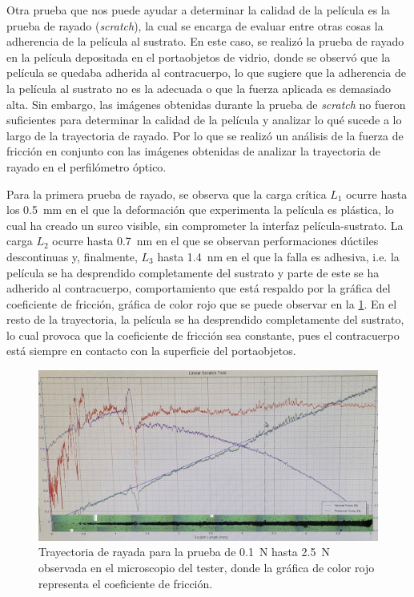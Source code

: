 \documentclass[12pt]{IEEEtran}
\begin{document}
Otra prueba que nos puede ayudar a determinar la calidad de la película es la prueba de rayado (\emph{scratch}), la cual se encarga de evaluar entre otras cosas la adherencia de la película al sustrato. En este caso, se realizó la prueba de rayado en la película depositada en el portaobjetos de vidrio, donde se observó que la película se quedaba adherida al contracuerpo, lo que sugiere que la adherencia de la película al sustrato no es la adecuada o que la fuerza aplicada es demasiado alta. Sin embargo, las imágenes obtenidas durante la prueba de \emph{scratch} no fueron suficientes para determinar la calidad de la película y analizar lo qué sucede a lo largo de la trayectoria de rayado. Por lo que se realizó un análisis de la fuerza de fricción en conjunto con las imágenes obtenidas de analizar la trayectoria de rayado en el perfilómetro óptico.

Para la primera prueba de rayado, se observa que la carga crítica \(L_{1}\) ocurre hasta los \qty{0.5}{\mm} en el que la deformación que experimenta la película es plástica, lo cual ha creado un surco visible, sin comprometer la interfaz película-sustrato. La carga \(L_{2}\) ocurre hasta \qty{0.7}{\nm} en el que se observan performaciones dúctiles descontinuas y, finalmente, \(L_{3}\) hasta \qty{1.4}{\nm} en el que la falla es adhesiva, i.e. la película se ha desprendido completamente del sustrato y parte de este se ha adherido al contracuerpo, comportamiento que está respaldo por la gráfica del coeficiente de fricción, gráfica de color rojo que se puede observar en la \cref{fig:scratch-test-1}. En el resto de la trayectoria, la película se ha desprendido completamente del sustrato, lo cual provoca que la coeficiente de fricción sea constante, pues el contracuerpo está siempre en contacto con la superficie del portaobjetos.

\begin{figure}[htb]
	\centering
	\includegraphics[width=\linewidth]{grafica-scratch_test_1}
	\caption{Trayectoria de rayada para la prueba de \qty{0.1}{\N} hasta \qty{2.5}{\N} observada en el microscopio del tester, donde la gráfica de color rojo representa el coeficiente de fricción.}
	\label{fig:scratch-test-1}
\end{figure}%
\end{document}
